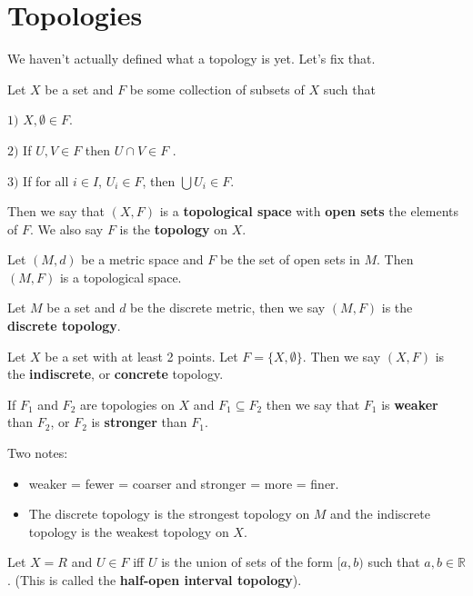 

\section{Topologies} We haven't actually defined what a topology is yet. Let's fix that.
\begin{definition}
	Let $X$ be a set and $F$ be some collection of subsets of $X$ such that
	
	$1)$ $X,\emptyset \in F$.
	
	$2)$ If $U,V \in F$ then $U\cap V \in F$ .
	
	$3)$ If for all $i\in I$, $U_{i} \in F$, then $\bigcup U_{i} \in F$.
	
	Then we say that $(X,F)$ is a {\bf topological space} with {\bf open sets} the elements of $F$. We also say $F$ is the {\bf topology} on $X$. 
\end{definition}
\begin{example}
	Let $(M,d)$ be a metric space and $F$ be the set of open sets in $M$. Then $(M,F)$ is a topological space. 
\end{example}
\begin{definition}
	Let $M$ be a set and $d$ be the discrete metric, then we say $(M,F)$ is the {\bf discrete topology}. 
\end{definition}
\begin{definition}
	Let $X$ be a set with at least 2 points. Let $F=\{X,\emptyset\}$. Then we say $(X,F)$ is the {\bf indiscrete}, or {\bf concrete} topology. 
\end{definition}
\begin{definition}
	If $F_{1}$ and $F_{2}$ are topologies on $X$ and $F_{1}\subseteq F_{2}$ then we say that $F_{1}$ is {\bf weaker} than $F_{2}$, or $F_{2}$ is {\bf stronger} than $F_{1}$. 
\end{definition}

Two notes: 
\begin{itemize}
	\item weaker = fewer = coarser and stronger = more = finer. 
	\item The discrete topology is the strongest topology on $M$ and the indiscrete topology is the weakest topology on $X$. 
\end{itemize}
\begin{example}
	Let $X=R$ and $U\in F$ iff $U$ is the union of sets of the form $[a,b)$ such that $a,b\in \mathbb{R}$. (This is called the {\bf half-open interval topology}). 
\end{example}

